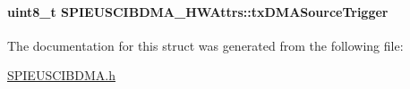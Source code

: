 \paragraph[{tx\-D\-M\-A\-Source\-Trigger}]{\setlength{\rightskip}{0pt plus 5cm}uint8\-\_\-t S\-P\-I\-E\-U\-S\-C\-I\-B\-D\-M\-A\-\_\-\-H\-W\-Attrs\-::tx\-D\-M\-A\-Source\-Trigger}\label{struct_s_p_i_e_u_s_c_i_b_d_m_a___h_w_attrs_a683a8356a28b557d278d969bab6f1ef8}


The documentation for this struct was generated from the following file\-:\begin{DoxyCompactItemize}
\item 
\hyperlink{_s_p_i_e_u_s_c_i_b_d_m_a_8h}{S\-P\-I\-E\-U\-S\-C\-I\-B\-D\-M\-A.\-h}\end{DoxyCompactItemize}
